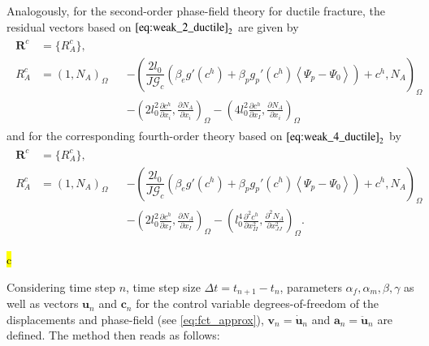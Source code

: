 Analogously, for the second-order phase-field theory for ductile fracture, the residual vectors based on $\eqref{eq:weak_2_ductile}_{2}$ are given by
\begin{equation} \label{eq:res_vecs_c2_ductile}
	\begin{aligned}
	\begin{alignedat}{2}
		\mathbf{R}^{c}&=\{R_{A}^{c}\}, \\
		R_{A}^{c} &= \left(1,N_{A}\right)_{\Omega} &&- \left(\dfrac{2l_{0}}{J\mathcal{G}_{c}}\left(\beta_{e}g'\left(c^{h}\right)+\beta_{p}g_{p}'\left(c^{h}\right)\left<\Psi_{p}-\Psi_{0}\right>\right)+c^{h},N_{A}\right)_{\Omega} \\
			& &&- \left(2l_{0}^{2}\frac{\partial c^{h}}{\partial x_{i}},\frac{\partial N_{A}}{\partial x_{i}}\right)_{\Omega} - \left(4l_{0}^{2}\frac{\partial c^{h}}{\partial x_{I}},\frac{\partial N_{A}}{\partial x_{i}}\right)_{\Omega}
			\end{alignedat}
	\end{aligned}
\end{equation}
and for the corresponding fourth-order theory based on $\eqref{eq:weak_4_ductile}_{2}$ by
\begin{equation} \label{eq:res_vecs_c4_ductile}
	\begin{aligned}
	\begin{alignedat}{2}
		\mathbf{R}^{c}&=\{R_{A}^{c}\}, \\
		R_{A}^{c} &= \left(1,N_{A}\right)_{\Omega} &&- \left(\dfrac{2l_{0}}{J\mathcal{G}_{c}}\left(\beta_{e}g'\left(c^{h}\right)+\beta_{p}g_{p}'\left(c^{h}\right)\left<\Psi_{p}-\Psi_{0}\right>\right)+c^{h},N_{A}\right)_{\Omega} \\
		 & &&- \left(2l_{0}^{2}\frac{\partial c^{h}}{\partial x_{I}},\frac{\partial N_{A}}{\partial x_{I}}\right)_{\Omega} - \left(l_{0}^{4}\frac{\partial^{2}c^{h}}{\partial x_{II}^{2}},\frac{\partial^{2}N_{A}}{\partial x_{JJ}^{2}}\right)_{\Omega}.
	\end{alignedat}
	\end{aligned}
\end{equation}

\hl{ c }

Considering time step $n$, time step size $\Delta t = t_{n+1}-t_{n}$, parameters $\alpha_{f},\alpha_{m},\beta,\gamma$ as well as vectors $\mathbf{u}_{n}$ and $\mathbf{c}_{n}$ for the control variable degrees-of-freedom of the displacements and phase-field (see \eqref{eq:fct_approx}), $\textbf{v}_{n}=\dot{\mathbf{u}}_{n}$ and $\mathbf{a}_{n}=\ddot{\mathbf{u}}_{n}$ are defined. The method then reads as follows:

